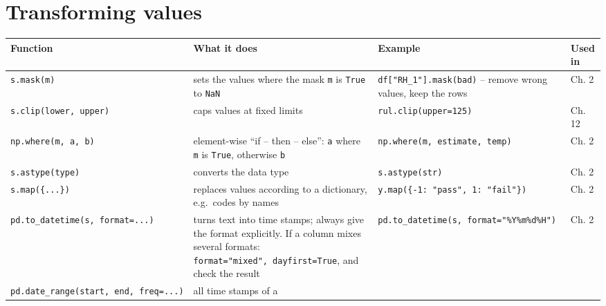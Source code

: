 \documentclass[
  letterpaper,
  DIV=11,
  numbers=noendperiod]{scrreprt}
\begin{document}
\section{Transforming values}\label{transforming-values}

\begin{longtable}[]{@{}
  >{\raggedright\arraybackslash}p{}
  >{\raggedright\arraybackslash}p{}
  >{\raggedright\arraybackslash}p{}
  >{\raggedright\arraybackslash}p{}@{}}
\toprule\noalign{}
\begin{minipage}[b]{\linewidth}\raggedright
Function
\end{minipage} & \begin{minipage}[b]{\linewidth}\raggedright
What it does
\end{minipage} & \begin{minipage}[b]{\linewidth}\raggedright
Example
\end{minipage} & \begin{minipage}[b]{\linewidth}\raggedright
Used in
\end{minipage} \\
\midrule\noalign{}
\endhead
\bottomrule\noalign{}
\endlastfoot
\texttt{s.mask(m)} & sets the values where the mask \texttt{m} is
\texttt{True} to \texttt{NaN} & \texttt{df{[}"RH\_1"{]}.mask(bad)} --
remove wrong values, keep the rows & Ch. 2 \\
\texttt{s.clip(lower,\ upper)} & caps values at fixed limits &
\texttt{rul.clip(upper=125)} & Ch. 12 \\
\texttt{np.where(m,\ a,\ b)} & element-wise ``if -- then -- else'':
\texttt{a} where \texttt{m} is \texttt{True}, otherwise \texttt{b} &
\texttt{np.where(m,\ estimate,\ temp)} & Ch. 2 \\
\texttt{s.astype(type)} & converts the data type &
\texttt{s.astype(str)} & Ch. 2 \\
\texttt{s.map(\{...\})} & replaces values according to a dictionary,
e.g.~codes by names & \texttt{y.map(\{-1:\ "pass",\ 1:\ "fail"\})} & Ch.
2 \\
\texttt{pd.to\_datetime(s,\ format=...)} & turns text into time stamps;
always give the format explicitly. If a column mixes several formats:
\texttt{format="mixed",\ dayfirst=True}, and check the result &
\texttt{pd.to\_datetime(s,\ format="\%Y\%m\%d\%H")} & Ch. 2 \\
\texttt{pd.date\_range(start,\ end,\ freq=...)} & all time stamps of a

\end{longtable}
\end{document}
